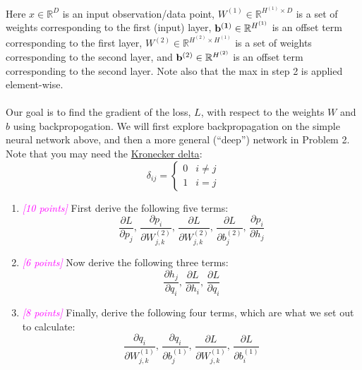 \documentclass{exam}
\newcommand{\grade}[1]{\small\textcolor{magenta}{\emph{[#1 points]}} \normalsize}
\begin{document}
\noindent Here $x \in \mathbb{R}^D$ is an input observation/data point, $W^{(1)} \in \mathbb{R}^{H^{(1)} \times D}$ is a set of weights corresponding to the first (input) layer, $\bold{b^{(1)}} \in \mathbb{R}^{H^{(1)}}$ is an offset term corresponding to the first layer, $W^{(2)} \in \mathbb{R}^{H^{(2)} \times H^{(1)}}$ is a set of weights corresponding to the second layer, and $\bold{b}^{(2)} \in \mathbb{R}^{H^{(2)}}$ is an offset term corresponding to the second layer. Note also that the max in step 2 is applied element-wise. 
\\
\\
Our goal is to find the gradient of the loss, $L$, with respect to the weights $W$ and $b$ using backpropogation. We will first explore backpropagation on the simple neural network above, and then a more general (``deep'') network in Problem 2. Note that you may need the \href{https://en.wikipedia.org/wiki/Kronecker_delta}{Kronecker delta}: 
$$\delta_{ij} = \begin{cases} 0 & i \neq j \\ 1 & i = j \end{cases}$$

\begin{enumerate}[label=(\alph*)]
    \item\grade{10} First derive the following five terms: $$\frac{\partial L}{\partial p_j}, \, \frac{\partial p_i}{\partial W^{(2)}_{j,k}}, \, \frac{\partial L}{\partial W^{(2)}_{j, k}}, \, \frac{\partial L}{\partial b^{(2)}_j}, \, \frac{\partial p_i}{\partial h_j}$$
    

    \newpage
    \item \grade{6} Now derive the following three terms: $$\frac{\partial h_j}{\partial q_i}, \, \frac{\partial L}{\partial h_i}, \, \frac{\partial L}{\partial q_i}$$
    

    
    \newpage
    \item \grade{8} Finally, derive the following four terms, which are what we set out to calculate: $$\frac{\partial q_i}{\partial W^{(1)}_{j, k}}, \, \frac{\partial q_i}{\partial b^{(1)}_j}, \, \frac{\partial L}{\partial W^{(1)}_{j, k}}, \, \frac{\partial L}{\partial b^{(1)}_{i}}$$
    
\end{enumerate}
\newpage
\end{document}
